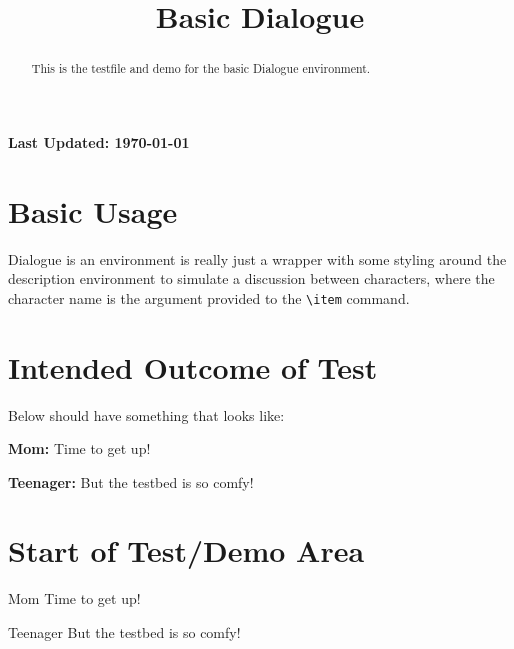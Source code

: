 \documentclass{ximera}
\title{Basic Dialogue}
\begin{document}
\begin{abstract}
    This is the testfile and demo for the basic Dialogue environment.
\end{abstract}
\maketitle

{{\Huge \bfseries Last Updated: \today}} \\


\section{Basic Usage}
Dialogue is an environment is really just a wrapper with some styling around the description environment 
to simulate a discussion between characters, where the character name is the argument provided to the \verb|\item| command.

\section{Intended Outcome of Test}

Below should have something that looks like:

\noindent\textbf{Mom:} Time to get up!

\noindent\textbf{Teenager:} But the testbed is so comfy!


\section{Start of Test/Demo Area}
\begin{dialogue}
    \item[Mom] Time to get up!
    \item[Teenager] But the testbed is so comfy!
\end{dialogue}

\hrulefill
\end{document}

